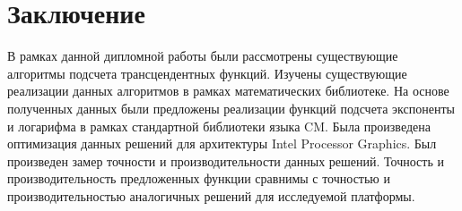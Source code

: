 \chapter{Заключение}

В рамках данной дипломной работы были рассмотрены существующие алгоритмы подсчета трансцендентных функций.
Изучены существующие реализации данных алгоритмов в рамках математических библиотеке.
На основе полученных данных были предложены реализации функций подсчета экспоненты и логарифма в рамках стандартной библиотеки языка CM.
Была произведена оптимизация данных решений для архитектуры \foreignlanguage{english}{Intel Processor Graphics}.
Был произведен замер точности и производительности данных решений.
Точность и производительность предложенных функции сравнимы с точностью и производительностью аналогичных решений для исследуемой платформы.
